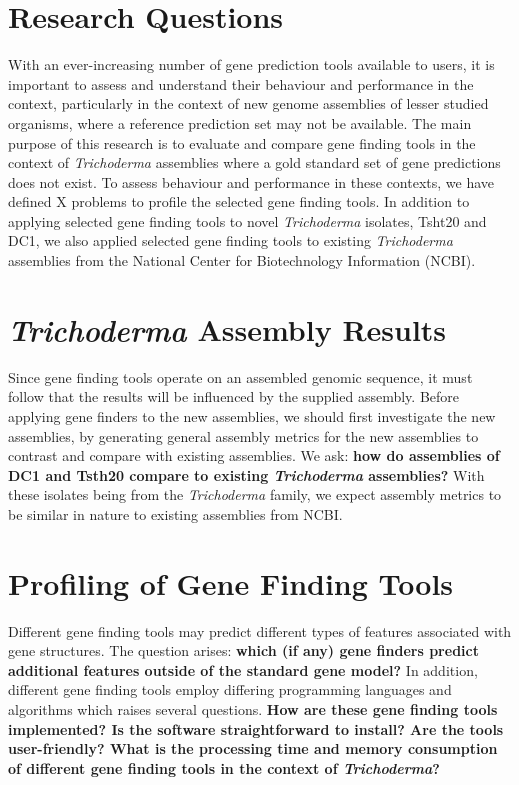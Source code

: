 \section{Research Questions}

With an ever-increasing number of gene prediction tools available to
users, it is important to assess and understand their behaviour and
performance in the context, particularly in the context of new genome
assemblies of lesser studied organisms, where a reference prediction
set may not be available. The main purpose of this research is to
evaluate and compare gene finding tools in the context of
\textit{Trichoderma} assemblies where a gold standard set of gene
predictions does not exist. To assess behaviour and performance in
these contexts, we have defined X problems to profile the selected
gene finding tools. In addition to applying selected gene finding
tools to novel \textit{Trichoderma} isolates, Tsht20 and DC1, we also
applied selected gene finding tools to existing \textit{Trichoderma}
assemblies from the National Center for Biotechnology Information
(NCBI).

\section{\textit{Trichoderma} Assembly Results}

Since gene finding tools operate on an assembled genomic sequence, it
must follow that the results will be influenced by the supplied
assembly. Before applying gene finders to the new assemblies, we
should first investigate the new assemblies, by generating general
assembly metrics for the new assemblies to contrast and compare with
existing assemblies. We ask: \textbf{how do assemblies of DC1 and
  Tsth20 compare to existing \textit{Trichoderma} assemblies?} With
these isolates being from the \textit{Trichoderma} family, we expect
assembly metrics to be similar in nature to existing assemblies from
NCBI.

\section{Profiling of Gene Finding Tools}

Different gene finding tools may predict different types of features
associated with gene structures. The question arises: \textbf{which
  (if any) gene finders predict additional features outside of the
  standard gene model?} In addition, different gene finding tools
employ differing programming languages and algorithms which raises
several questions. \textbf{How are these gene finding tools
  implemented? Is the software straightforward to install? Are the
  tools user-friendly? What is the processing time and memory
  consumption of different gene finding tools in the context of
  \textit{Trichoderma}?}

